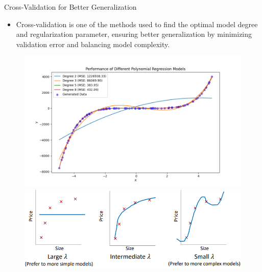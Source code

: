 \documentclass[serif, aspectratio=169]{beamer}
\begin{document}
\begin{frame}{Cross-Validation for Better Generalization}
    \begin{itemize}
        \item Cross-validation is one of the methods used to find the optimal model degree and regularization parameter, ensuring better generalization by minimizing validation error and balancing model complexity.
    \end{itemize}
    \begin{figure}
        \centering
        \begin{minipage}{0.48\linewidth}
            \centering
            \includegraphics[width=\linewidth]{pic/Figure_16.png}
        \end{minipage}
        \hfill
        \begin{minipage}{0.48\linewidth}
            \centering
            \includegraphics[width=\linewidth]{pic/Figure_29.png}
        \end{minipage}
    \end{figure}
\end{frame}
\end{document}
